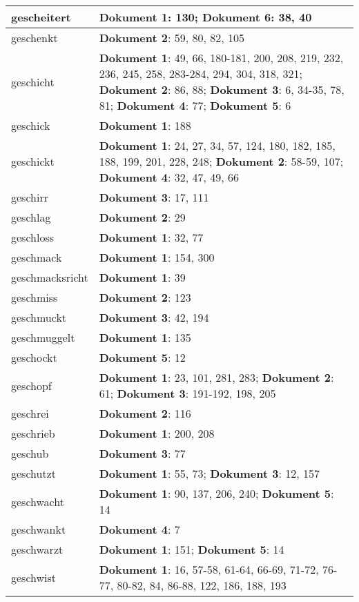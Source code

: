 \documentclass[a5paper]{article}
\begin{document}
\begin{longtable}[l]{|l|p{3in}|}
\hline
gescheitert & \textbf{Dokument 1}: 130; \textbf{Dokument 6}: 38, 40 \\
\hline
geschenkt & \textbf{Dokument 2}: 59, 80, 82, 105 \\
\hline
geschicht & \textbf{Dokument 1}: 49, 66, 180-181, 200, 208, 219, 232, 236, 245, 258, 283-284, 294, 304, 318, 321; \textbf{Dokument 2}: 86, 88; \textbf{Dokument 3}: 6, 34-35, 78, 81; \textbf{Dokument 4}: 77; \textbf{Dokument 5}: 6 \\
\hline
geschick & \textbf{Dokument 1}: 188 \\
\hline
geschickt & \textbf{Dokument 1}: 24, 27, 34, 57, 124, 180, 182, 185, 188, 199, 201, 228, 248; \textbf{Dokument 2}: 58-59, 107; \textbf{Dokument 4}: 32, 47, 49, 66 \\
\hline
geschirr & \textbf{Dokument 3}: 17, 111 \\
\hline
geschlag & \textbf{Dokument 2}: 29 \\
\hline
geschloss & \textbf{Dokument 1}: 32, 77 \\
\hline
geschmack & \textbf{Dokument 1}: 154, 300 \\
\hline
geschmacksricht & \textbf{Dokument 1}: 39 \\
\hline
geschmiss & \textbf{Dokument 2}: 123 \\
\hline
geschmuckt & \textbf{Dokument 3}: 42, 194 \\
\hline
geschmuggelt & \textbf{Dokument 1}: 135 \\
\hline
geschockt & \textbf{Dokument 5}: 12 \\
\hline
geschopf & \textbf{Dokument 1}: 23, 101, 281, 283; \textbf{Dokument 2}: 61; \textbf{Dokument 3}: 191-192, 198, 205 \\
\hline
geschrei & \textbf{Dokument 2}: 116 \\
\hline
geschrieb & \textbf{Dokument 1}: 200, 208 \\
\hline
geschub & \textbf{Dokument 3}: 77 \\
\hline
geschutzt & \textbf{Dokument 1}: 55, 73; \textbf{Dokument 3}: 12, 157 \\
\hline
geschwacht & \textbf{Dokument 1}: 90, 137, 206, 240; \textbf{Dokument 5}: 14 \\
\hline
geschwankt & \textbf{Dokument 4}: 7 \\
\hline
geschwarzt & \textbf{Dokument 1}: 151; \textbf{Dokument 5}: 14 \\
\hline
geschwist & \textbf{Dokument 1}: 16, 57-58, 61-64, 66-69, 71-72, 76-77, 80-82, 84, 86-88, 122, 186, 188, 193 \\

\end{longtable}
\end{document}
